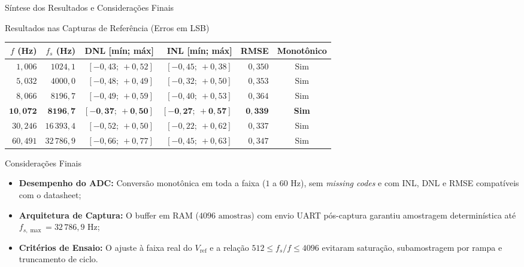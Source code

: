 \documentclass{beamer}
\begin{document}
\begin{frame}{Síntese dos Resultados e Considerações Finais}
\begin{block}{Resultados nas Capturas de Referência (Erros em LSB)}
\scriptsize
\setlength{\tabcolsep}{3pt}
\renewcommand{\arraystretch}{1.08}
\begin{tabular*}{\linewidth}{@{\extracolsep{\fill}}rrrrrc}
\hline
\textbf{$f$ (Hz)} & \textbf{$f_s$ (Hz)} & \textbf{DNL [mín; máx]} & \textbf{INL [mín; máx]} & \textbf{RMSE} & \textbf{Monotônico} \\\hline
$1{,}006$ & $1024{,}1$ & $[-0{,}43;\ +0{,}52]$ & $[-0{,}45;\ +0{,}38]$ & $0{,}350$ & Sim \\
$5{,}032$ & $4000{,}0$ & $[-0{,}48;\ +0{,}49]$ & $[-0{,}32;\ +0{,}50]$ & $0{,}353$ & Sim \\
$8{,}066$ & $8196{,}7$ & $[-0{,}49;\ +0{,}59]$ & $[-0{,}40;\ +0{,}53]$ & $0{,}364$ & Sim \\
$\mathbf{10{,}072}$ & $\mathbf{8196{,}7}$ & $\mathbf{[-0{,}37;\ +0{,}50]}$ & $\mathbf{[-0{,}27;\ +0{,}57]}$ & $\mathbf{0{,}339}$ & \textbf{Sim} \\
$30{,}246$ & $16\,393{,}4$ & $[-0{,}52;\ +0{,}50]$ & $[-0{,}22;\ +0{,}62]$ & $0{,}337$ & Sim \\
$60{,}491$ & $32\,786{,}9$ & $[-0{,}66;\ +0{,}77]$ & $[-0{,}45;\ +0{,}63]$ & $0{,}347$ & Sim \\\hline
\end{tabular*}
\end{block}

\vspace{-0.15cm}
\begin{exampleblock}{Considerações Finais}
\footnotesize
\begin{itemize}
\item \textbf{Desempenho do ADC:} Conversão monotônica em toda a faixa ($1$ a $60\text{ Hz}$), sem \textit{missing codes} e com INL, DNL e RMSE compatíveis com o datasheet;
\item \textbf{Arquitetura de Captura:} O buffer em RAM ($4096\text{ amostras}$) com envio UART pós-captura garantiu amostragem determinística até $f_{s,\max} = 32\,786{,}9\text{ Hz}$;
\item \textbf{Critérios de Ensaio:} O ajuste à faixa real do $V_{\text{ref}}$ e a relação $512 \le f_s/f \le 4096$ evitaram saturação, subamostragem por rampa e truncamento de ciclo.
\end{itemize}
\end{exampleblock}
\end{frame}
\end{document}
